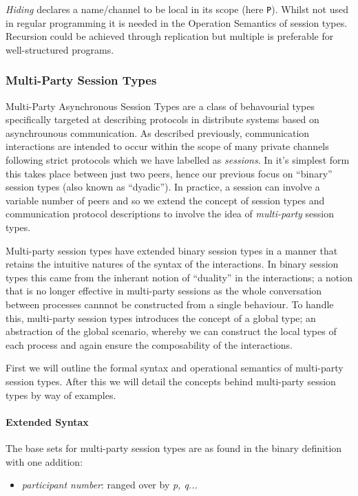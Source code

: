 \documentclass[11pt]{scrartcl}
\begin{document}
\emph{Hiding} declares a name/channel to be local in its scope (here 
\texttt{P}). Whilst not used in regular programming it is needed in the 
Operation Semantics of session types. Recursion could be achieved through 
replication but multiple is preferable for well-structured programs.

\subsubsection{Multi-Party Session Types}
Multi-Party Asynchronous Session Types are a class of behavourial types
specifically targeted at describing protocols in distribute systems
based on asynchrounous communication\cite{CCPY15}. As described previously,
communication interactions are intended to occur within the scope of many
private channels following strict protocols which we have labelled as
\emph{sessions}. In it's simplest form this takes place between just two
peers, hence our previous focus on ``binary'' session types (also known as
``dyadic''). In practice, a session can involve a variable number of peers
and so we extend the concept of session types and communication protocol
descriptions to involve the idea of \emph{multi-party} session types.

Multi-party session types have extended binary session types in a manner
that retains the intuitive natures of the syntax of the interactions. In
binary session types this came from the inherant notion of ``duality'' in
the interactions; a notion that is no longer effective in multi-party 
sessions as the whole conversation between processes cannnot be constructed
from a single behaviour. To handle this, multi-party session types
introduces the concept of a global type; an abstraction of the global
scenario, whereby we can construct the local types of each process and
again ensure the composability of the interactions\cite{HYC08}. 

First we will outline the formal syntax and operational semantics of 
multi-party session types. After this we will detail the concepts behind 
multi-party session types by way of examples.

\paragraph{Extended Syntax}
The base sets for multi-party session types are as found in the binary
definition with one addition:

\begin{itemize}[noitemsep]
	\item[] \emph{participant number}: ranged over by \emph{p, q...}
\end{itemize}
\end{document}
